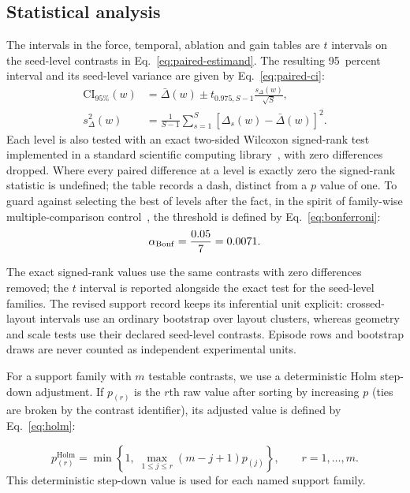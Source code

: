 \subsection{Statistical analysis}

The intervals in the force, temporal, ablation and gain tables are $t$ intervals
on the seed-level contrasts in Eq.~\eqref{eq:paired-estimand}. The resulting
95~percent interval and its seed-level variance are given by
Eq.~\eqref{eq:paired-ci}:
\begin{equation}
  \begin{aligned}
  \mathrm{CI}_{95\%}(w)&=\bar\Delta(w)\pm
  t_{0.975,S-1}\frac{s_{\Delta}(w)}{\sqrt{S}},\\
  s_{\Delta}^2(w)&=\frac{1}{S-1}\sum_{s=1}^{S}
  [\Delta_s(w)-\bar\Delta(w)]^2 .
  \end{aligned}
  \label{eq:paired-ci}
\end{equation}
Each level is also tested with an exact two-sided Wilcoxon signed-rank
test~\cite{wilcoxon1945individual} implemented in a standard scientific computing
library~\cite{virtanen2020scipy}, with zero differences dropped. Where every
paired difference at a level is exactly zero the signed-rank statistic is
undefined; the table records a dash, distinct from a $p$ value of one. To
guard against selecting the best of \NWindLevels{} levels after the fact, in
the spirit of family-wise multiple-comparison control~\cite{dunn1961multiple},
the threshold is defined by Eq.~\eqref{eq:bonferroni}:
\begin{equation}
  \alpha_{\mathrm{Bonf}}=\frac{0.05}{7{}}
  =0.0071{}.
  \label{eq:bonferroni}
\end{equation}

The exact signed-rank values use the same contrasts with zero differences removed;
the $t$ interval is reported alongside the exact test for the seed-level families.
The revised support record keeps its inferential unit explicit: crossed-layout
intervals use an ordinary bootstrap over layout clusters, whereas geometry and
scale tests use their declared seed-level contrasts. Episode rows and bootstrap
draws are never counted as independent experimental units.

For a support family with $m$ testable contrasts, we use a deterministic Holm
step-down adjustment. If $p_{(r)}$ is the $r$th raw value after sorting by
increasing $p$ (ties are broken by the contrast identifier), its adjusted value is
defined by Eq.~\eqref{eq:holm}:

\begin{equation}
  p^{\mathrm{Holm}}_{(r)}=
  \min\!\left\{1,\;\max_{1\leq j\leq r}(m-j+1)p_{(j)}\right\},
  \qquad r=1,\ldots,m .
  \label{eq:holm}
\end{equation}
This deterministic step-down value is used for each named support family.


